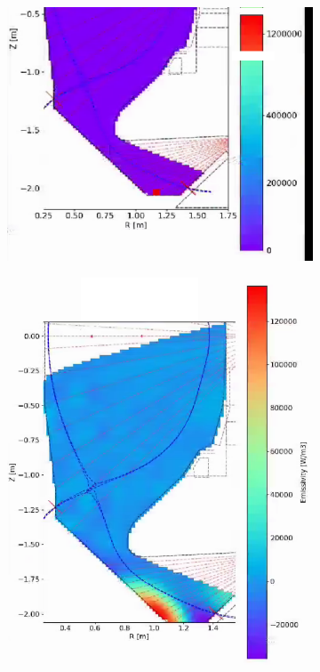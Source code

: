 \begin{figure}
     \centering
     \begin{subfigure}{0.45\textwidth}
         \centering
         \includegraphics[trim={0 0 30 0},clip,width=\textwidth]{Chapters/appendix1/figs/phantom_sdx.png}
     \end{subfigure}
     \hfill
     \begin{subfigure}{0.45\textwidth}
         \centering
         \includegraphics[width=\textwidth]{Chapters/appendix1/figs/inversion_sdx.png}
     \end{subfigure}


\end{figure}
